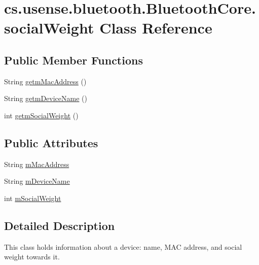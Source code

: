 \hypertarget{classcs_1_1usense_1_1bluetooth_1_1_bluetooth_core_1_1social_weight}{}\section{cs.\+usense.\+bluetooth.\+Bluetooth\+Core.\+social\+Weight Class Reference}
\label{classcs_1_1usense_1_1bluetooth_1_1_bluetooth_core_1_1social_weight}
\subsection*{Public Member Functions}
\begin{DoxyCompactItemize}
\item 
String \hyperlink{classcs_1_1usense_1_1bluetooth_1_1_bluetooth_core_1_1social_weight_a5b1d8231e14404ce9ad9cd2d595e5ee1}{getm\+Mac\+Address} ()
\item 
String \hyperlink{classcs_1_1usense_1_1bluetooth_1_1_bluetooth_core_1_1social_weight_aa3159dc4b6b5e758d8156fd9a29d19d0}{getm\+Device\+Name} ()
\item 
int \hyperlink{classcs_1_1usense_1_1bluetooth_1_1_bluetooth_core_1_1social_weight_ae3d397ae0963c4cc91ad6008a35ab403}{getm\+Social\+Weight} ()
\end{DoxyCompactItemize}
\subsection*{Public Attributes}
\begin{DoxyCompactItemize}
\item 
String \hyperlink{classcs_1_1usense_1_1bluetooth_1_1_bluetooth_core_1_1social_weight_af0a9c30b68a2ab475de31d2167c47b6d}{m\+Mac\+Address}
\item 
String \hyperlink{classcs_1_1usense_1_1bluetooth_1_1_bluetooth_core_1_1social_weight_a19b055752980277d829ef14707f1eff3}{m\+Device\+Name}
\item 
int \hyperlink{classcs_1_1usense_1_1bluetooth_1_1_bluetooth_core_1_1social_weight_aacf0d761e0b96154c51c4367c893ef5c}{m\+Social\+Weight}
\end{DoxyCompactItemize}


\subsection{Detailed Description}
This class holds information about a device\+: name, M\+A\+C address, and social weight towards it. 

